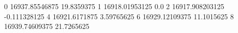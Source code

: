 0 16937.85546875 19.8359375
1 16918.01953125 0.0
2 16917.908203125 -0.111328125
4 16921.6171875 3.59765625
6 16929.12109375 11.1015625
8 16939.74609375 21.7265625
